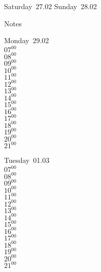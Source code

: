 \documentclass[11pt,a4paper]{book}\usepackage[]{graphicx}\usepackage[]{color}
\begin{document}
\begin{weekendbox}
  Saturday~27.02
  \tcblower
  Sunday~28.02
\end{weekendbox} %
\begin{notebox}
  Notes
\end{notebox}
\clearpage
\begin{headerbox}
\end{headerbox}
\begin{weekdaybox}
  Monday~29.02\\
  { 
  \vfill
  $07^{00}$\\
$08^{00}$\\
$09^{00}$\\
$10^{00}$\\
$11^{00}$\\
$12^{00}$\\
$13^{00}$\\
$14^{00}$\\
$15^{00}$\\
$16^{00}$\\
$17^{00}$\\
$18^{00}$\\
$19^{00}$\\
$20^{00}$\\
$21^{00}$\\
  }
\end{weekdaybox}
\begin{weekdaybox}
  Tuesday~01.03\\
  { 
  \vfill
  $07^{00}$\\
$08^{00}$\\
$09^{00}$\\
$10^{00}$\\
$11^{00}$\\
$12^{00}$\\
$13^{00}$\\
$14^{00}$\\
$15^{00}$\\
$16^{00}$\\
$17^{00}$\\
$18^{00}$\\
$19^{00}$\\
$20^{00}$\\
$21^{00}$\\
  }
\end{weekdaybox}
\end{document}
